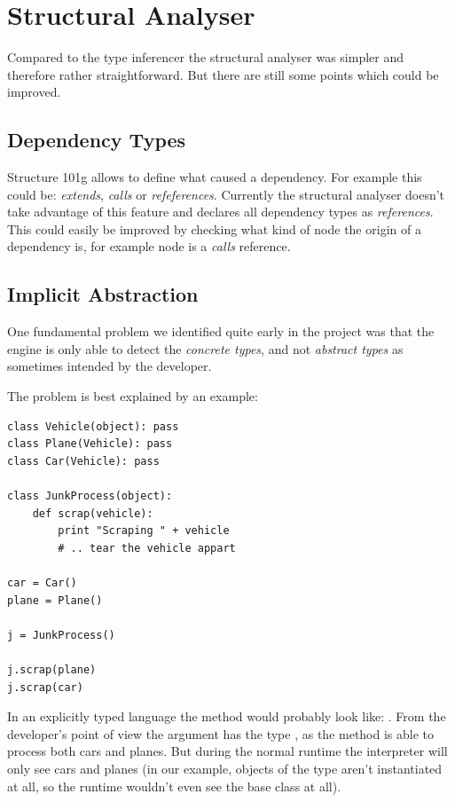 \documentclass[12pt,halfparskip,DIV11,BCOR10mm]{scrreprt}
\begin{document}
\section{Structural Analyser}

Compared to the type inferencer the structural analyser was simpler and therefore rather straightforward. But there are still some points which could be improved.

\subsection{Dependency Types}

Structure 101g allows to define what caused a dependency. For example this could be: \emph{extends}, \emph{calls} or \emph{refeferences}. Currently the structural analyser doesn't take advantage of this feature and declares all dependency types as \emph{references}. This could easily be improved by checking what kind of node the origin of a dependency is, for example  node is a \emph{calls} reference.

\subsection{Implicit Abstraction}

One fundamental problem we identified quite early in the project was that the engine is only able to detect the \emph{concrete types}, and not \emph{abstract types} as sometimes intended by the developer.

The problem is best explained by an example:

\begin{lstlisting}
class Vehicle(object): pass
class Plane(Vehicle): pass
class Car(Vehicle): pass

class JunkProcess(object): 
    def scrap(vehicle):
        print "Scraping " + vehicle
        # .. tear the vehicle appart
        
car = Car()
plane = Plane()

j = JunkProcess()

j.scrap(plane)
j.scrap(car)
\end{lstlisting}

In an explicitly typed language the  method would probably look like: . From the developer's point of view the argument has the type , as the method is able to process both cars and planes. But during the normal runtime the interpreter will only see cars and planes (in our example, objects of the type  aren't instantiated at all, so the runtime wouldn't even see the base class at all).
\end{document}
